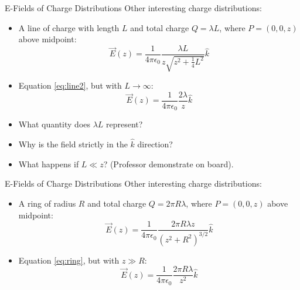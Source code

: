 \documentclass{beamer}
\begin{document}
\begin{frame}{E-Fields of Charge Distributions}
Other interesting charge distributions:
\begin{itemize}
\item A line of charge with length $L$ and total charge $Q = \lambda L$, where $P = (0,0,z)$ above midpoint:
\begin{equation}
\vec{E}(z) = \frac{1}{4\pi\epsilon_0} \frac{\lambda L}{z\sqrt{z^2 + \frac{1}{4} L^2}} \hat{k} \label{eq:line2}
\end{equation}
\item Equation \ref{eq:line2}, but with $L \rightarrow \infty$:
\begin{equation}
\vec{E}(z) = \frac{1}{4\pi\epsilon_0} \frac{2\lambda}{z} \hat{k}
\end{equation}
\end{itemize}
\begin{itemize}
\item What quantity does $\lambda L$ represent?
\item Why is the field strictly in the $\hat{k}$ direction?
\item What happens if $L \ll z$? (Professor demonstrate on board).
\end{itemize}
\end{frame}

\begin{frame}{E-Fields of Charge Distributions}
Other interesting charge distributions:
\begin{itemize}
\item A ring of radius $R$ and total charge $Q = 2\pi R\lambda$, where $P = (0,0,z)$ above midpoint:
\begin{equation}
\vec{E}(z) = \frac{1}{4\pi\epsilon_0} \frac{2\pi R \lambda z}{\left(z^2 + R^2\right)^{3/2}} \hat{k} \label{eq:ring}
\end{equation}
\item Equation \ref{eq:ring}, but with $z \gg R$:
\begin{equation}
\vec{E}(z) = \frac{1}{4\pi\epsilon_0} \frac{2\pi R \lambda }{z^2} \hat{k} \label{eq:ring2}
\end{equation}
\end{itemize}
\end{frame}
\end{document}
